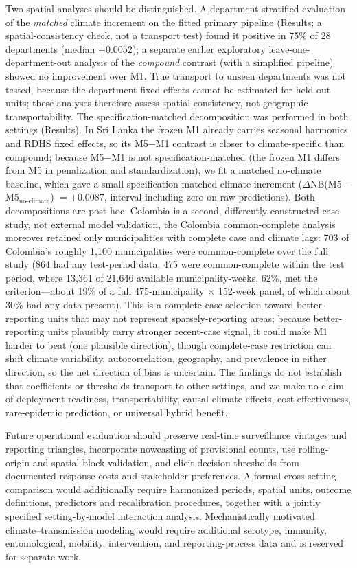 \documentclass[11pt,a4paper]{article}
\begin{document}
Two spatial analyses should be distinguished. A department-stratified evaluation of the \emph{matched} climate increment on the fitted primary pipeline (Results; a spatial-consistency check, not a transport test) found it positive in 75\% of 28 departments (median $+0.0052$); a separate earlier exploratory leave-one-department-out analysis of the \emph{compound} contrast (with a simplified pipeline) showed no improvement over M1. True transport to unseen departments was not tested, because the department fixed effects cannot be estimated for held-out units; these analyses therefore assess spatial consistency, not geographic transportability. The specification-matched decomposition was performed in both settings (Results). In Sri Lanka the frozen M1 already carries seasonal harmonics and RDHS fixed effects, so its M5$-$M1 contrast is closer to climate-specific than compound; because M5$-$M1 is not specification-matched (the frozen M1 differs from M5 in penalization and standardization), we fit a matched no-climate baseline, which gave a small specification-matched climate increment ($\Delta$NB(M5$-$M5$_{\text{no-climate}}$) $=+0.0087$, interval including zero on raw predictions). Both decompositions are post hoc. Colombia is a second, differently-constructed case study, not external model validation, the Colombia common-complete analysis moreover retained only municipalities with complete case and climate lags: 703 of Colombia's roughly 1{,}100 municipalities were common-complete over the full study (864 had any test-period data; 475 were common-complete within the test period, where 13{,}361 of 21{,}646 available municipality-weeks, 62\%, met the criterion---about 19\% of a full 475-municipality $\times$ 152-week panel, of which about 30\% had any data present). This is a complete-case selection toward better-reporting units that may not represent sparsely-reporting areas; because better-reporting units plausibly carry stronger recent-case signal, it could make M1 harder to beat (one plausible direction), though complete-case restriction can shift climate variability, autocorrelation, geography, and prevalence in either direction, so the net direction of bias is uncertain. The findings do not establish that coefficients or thresholds transport to other settings, and we make no claim of deployment readiness, transportability, causal climate effects, cost-effectiveness, rare-epidemic prediction, or universal hybrid benefit.

Future operational evaluation should preserve real-time surveillance vintages and reporting triangles, incorporate nowcasting of provisional counts, use rolling-origin and spatial-block validation, and elicit decision thresholds from documented response costs and stakeholder preferences. A formal cross-setting comparison would additionally require harmonized periods, spatial units, outcome definitions, predictors and recalibration procedures, together with a jointly specified setting-by-model interaction analysis. Mechanistically motivated climate--transmission modeling would require additional serotype, immunity, entomological, mobility, intervention, and reporting-process data and is reserved for separate work.
\end{document}
